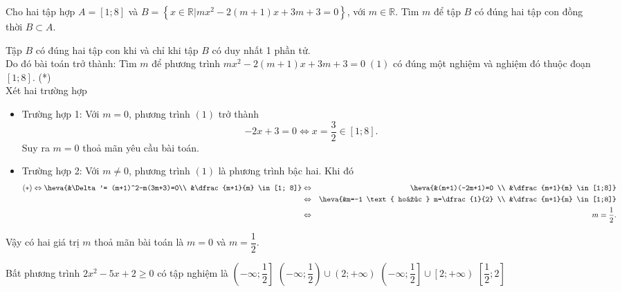 \begin{bt}%
	Cho hai tập hợp $A= [1; 8]$ và $B= \left\{ x \in \mathbb{R} \big| mx^2-2(m+1)x+3m+3=0\right\}$, với $m \in \mathbb{R}$. Tìm $m$ để tập $B$ có đúng hai tập con đồng thời $B \subset A$.
	\loigiai
	{
		Tập $B$ có đúng hai tập con khi và chỉ khi tập $B$ có duy nhất 1 phần tử.\\
		Do đó bài toán trở thành: Tìm $m$ để phương trình $mx^2-2(m+1)x+3m+3=0\; (1)$ có đúng một nghiệm và nghiệm đó thuộc đoạn $[1; 8]$. \quad (*)\\
		Xét hai trường hợp
		\begin{itemize}
			\item Trường hợp 1: Với $m=0$, phương trình $(1)$ trở thành 
			\[
			-2x+3=0 \Leftrightarrow x= \dfrac{3}{2} \in [1; 8].
			\]
			Suy ra $m=0$ thoả mãn yêu cầu bài toán.
			\item Trường hợp 2: Với $m \neq 0$, phương trình $(1)$ là phương trình bậc hai. Khi đó
			\begin{eqnarray*}
				(*) \Leftrightarrow \heva{&\Delta'= (m+1)^2-m(3m+3)=0\\ &\dfrac{m+1}{m} \in [1; 8]} &\Leftrightarrow& \heva{&(m+1)(-2m+1)=0 \\ &\dfrac{m+1}{m} \in [1;8]}\\
				&\Leftrightarrow& \heva{&m=-1 \text{ hoặc } m=\dfrac{1}{2} \\ &\dfrac{m+1}{m} \in [1;8]}\\ &\Leftrightarrow& m=\dfrac{1}{2}.
			\end{eqnarray*}			
			\end{itemize}
		Vậy có hai giá trị $m$ thoả mãn bài toán là $m=0$ và $m=\dfrac{1}{2}$.
	}
\end{bt}

\begin{ex}%
	Bất phương trình $2x^2-5x+2\geq 0$ có tập  nghiệm là
	 \choice
		 {$\left(-\infty;\dfrac{1}{2} \right]$}
		{$\left(-\infty;\dfrac{1}{2}\right)\cup  \left(2;+\infty \right)$}
		{\True  $\left(-\infty;\dfrac{1}{2}\right]\cup \left[2;+\infty \right)$}
		{$\left[\dfrac{1}{2};2\right]$} 
	 \loigiai{
		Ta có $2x^2-5x+2\geq 0\Leftrightarrow\hoac{&x\geq2\\&x\leq \dfrac{1}{2}.}$\\ Vậy tập nghiệm của phương trình là $S=\left(-\infty;\dfrac{1}{2}\right]\cup \left[2;+\infty  \right)$.
	 }
\end{ex}


